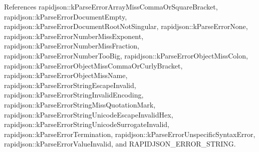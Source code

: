 References rapidjson\+::k\+Parse\+Error\+Array\+Miss\+Comma\+Or\+Square\+Bracket, rapidjson\+::k\+Parse\+Error\+Document\+Empty, rapidjson\+::k\+Parse\+Error\+Document\+Root\+Not\+Singular, rapidjson\+::k\+Parse\+Error\+None, rapidjson\+::k\+Parse\+Error\+Number\+Miss\+Exponent, rapidjson\+::k\+Parse\+Error\+Number\+Miss\+Fraction, rapidjson\+::k\+Parse\+Error\+Number\+Too\+Big, rapidjson\+::k\+Parse\+Error\+Object\+Miss\+Colon, rapidjson\+::k\+Parse\+Error\+Object\+Miss\+Comma\+Or\+Curly\+Bracket, rapidjson\+::k\+Parse\+Error\+Object\+Miss\+Name, rapidjson\+::k\+Parse\+Error\+String\+Escape\+Invalid, rapidjson\+::k\+Parse\+Error\+String\+Invalid\+Encoding, rapidjson\+::k\+Parse\+Error\+String\+Miss\+Quotation\+Mark, rapidjson\+::k\+Parse\+Error\+String\+Unicode\+Escape\+Invalid\+Hex, rapidjson\+::k\+Parse\+Error\+String\+Unicode\+Surrogate\+Invalid, rapidjson\+::k\+Parse\+Error\+Termination, rapidjson\+::k\+Parse\+Error\+Unspecific\+Syntax\+Error, rapidjson\+::k\+Parse\+Error\+Value\+Invalid, and R\+A\+P\+I\+D\+J\+S\+O\+N\+\_\+\+E\+R\+R\+O\+R\+\_\+\+S\+T\+R\+I\+NG.

